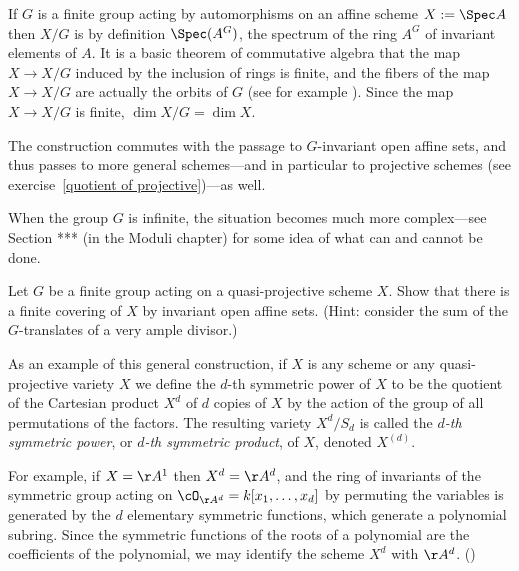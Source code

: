 If $G$ is a finite group acting by automorphisms on an affine scheme $X:=\Spec A$ then $X/G$ is by definition $\Spec(A^G)$, the spectrum of the ring $A^G$ of invariant elements of $A$. It is a basic theorem of commutative algebra that the map $X\to X/G$ induced by the inclusion of rings is finite, and the fibers of the map $X\to X/G$ are actually the orbits of $G$ (see for example \cite[Theorem ***]{Eisenbud1995}).  Since the map $X\to X/G$ is finite, $\dim X/G = \dim X$. 

The construction commutes with the passage to $G$-invariant open affine sets, and thus passes to more general schemes---and in particular to projective schemes (see exercise~\ref{quotient of projective})---as well.

When the group $G$ is infinite, the situation becomes much more complex---see Section *** (in the Moduli chapter) for some  idea of what can and cannot be done.

\begin{exercise}
 Let $G$ be a finite group acting on a quasi-projective scheme $X$. Show that there is a finite covering of $X$ by invariant open affine sets. (Hint: consider the sum of the $G$-translates of a very ample divisor.)
\end{exercise}

As an example of this general construction, if $X$ is any scheme or any quasi-projective variety $X$ we define the $d$-th symmetric power of $X$ to be the quotient of the Cartesian product $X^d$ of $d$ copies of $X$ by the action of the group of all permutations of the factors. The resulting variety $X^d/S_d$ is called the \emph{$d$-th symmetric power}, or \emph{$d$-th symmetric product}, of $X$, denoted  $X^{(d)}$. 


For example, if $X=\AA^{1}$ then $X^{d} = \AA^{d}$, and the ring of invariants of the symmetric group acting on
$\cO_{\AA^{d}} = k[x_{1}, \dots, x_{d}]$ by permuting the variables is generated by the $d$ elementary symmetric functions, which generate a polynomial subring. Since the symmetric functions of the roots of a polynomial are the coefficients of
the polynomial, we may identify the scheme $X^{d}$ with $\AA^{d}$. (\cite[Exercises 1.6, 13.2-13.4]{Eisenbud1995})

